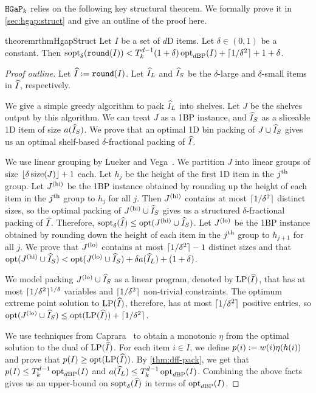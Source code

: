 $\operatorname{\mathtt{HGaP}}_{k}$ relies on the following key structural theorem.
We formally prove it in \cref{sec:hgap:struct} and give an outline of the proof here.
\begin{restatable}{theorem}{rthmHgapStruct}
\label{thm:hgap:struct}
Let $I$ be a set of $d$D items. Let $\delta \in (0, 1)$ be a constant. Then
$\operatorname{sopt}_{\delta}(\operatorname{\mathtt{round}}(I)) < T_k^{d-1}(1+\delta)\operatorname{opt}_{d\mathrm{BP}}(I) + \lceil 1/\delta^2 \rceil + 1 + \delta$.
\end{restatable}
\begin{proof}[Proof outline]
Let $\widehat{I} := \operatorname{\mathtt{round}}(I)$. Let $\widehat{I}_L$ and $\widehat{I}_S$ be the
$\delta$-large and $\delta$-small items in $\widehat{I}$, respectively.

We give a simple greedy algorithm to pack $\widehat{I}_L$ into shelves.
Let $J$ be the shelves output by this algorithm.
We can treat $J$ as a 1BP instance,
and $\widehat{I}_S$ as a sliceable 1D item of size $a(\widehat{I}_S)$.
We prove that an optimal 1D bin packing of $J \cup \widehat{I}_S$ gives us
an optimal shelf-based $\delta$-fractional packing of $\widehat{I}$.

We use linear grouping by Lueker and Vega~\cite{bp-aptas}.
We partition $J$ into linear groups of size $\left\lfloor \delta\operatorname{size}(J) \right\rfloor + 1$ each.
Let $h_j$ be the height of the first 1D item in the $j^{\textrm{th}}$ group.
Let $J^{\mathrm{(hi)}}$ be the 1BP instance obtained by rounding up the height of each item
in the $j^{\textrm{th}}$ group to $h_j$ for all $j$.
Then $J^{\mathrm{(hi)}}$ contains at most $\lceil 1/\delta^2 \rceil$ distinct sizes,
so the optimal packing of $J^{\mathrm{(hi)}} \cup \widehat{I}_S$ gives us a
structured $\delta$-fractional packing of $\widehat{I}$.
Therefore, $\operatorname{sopt}_{\delta}(\widehat{I}) \le \operatorname{opt}(J^{\mathrm{(hi)}} \cup \widehat{I}_S)$.
Let $J^{\mathrm{(lo)}}$ be the 1BP instance obtained by rounding down the height of each item
in the $j^{\textrm{th}}$ group to $h_{j+1}$ for all $j$.
We prove that $J^{\mathrm{(lo)}}$ contains at most $\lceil 1/\delta^2 \rceil-1$ distinct sizes and that
$\operatorname{opt}(J^{\mathrm{(hi)}} \cup \widehat{I}_S) < \operatorname{opt}(J^{\mathrm{(lo)}} \cup \widehat{I}_S) + \delta a(\widehat{I}_L) + (1 + \delta)$.

We model packing $J^{\mathrm{(lo)}} \cup \widehat{I}_S$ as a linear program, denoted by $\operatorname{LP}(\widehat{I})$,
that has at most $\lceil 1/\delta^2 \rceil^{1/\delta}$ variables and $\lceil 1/\delta^2 \rceil$ non-trivial constraints.
The optimum extreme point solution to $\operatorname{LP}(\widehat{I})$, therefore,
has at most $\lceil 1/\delta^2 \rceil$ positive entries,
so $\operatorname{opt}(J^{\mathrm{(lo)}} \cup \widehat{I}_S) \le \operatorname{opt}(\operatorname{LP}(\widehat{I})) + \lceil 1/\delta^2 \rceil$.

We use techniques from Caprara~\cite{caprara2008} to obtain a
monotonic \dff{} $\eta$ from the optimal solution to the dual of $\operatorname{LP}(\widehat{I})$.
For each item $i \in I$, we define $p(i) := w(i)\eta(h(i))$
and prove that $p(I) \ge \operatorname{opt}(\operatorname{LP}(\widehat{I}))$.
By \cref{thm:dff-pack}, we get that $p(I) \le T_k^{d-1}\operatorname{opt}_{d\mathrm{BP}}(I)$
and $a(\widehat{I}_L) \le T_k^{d-1}\operatorname{opt}_{d\mathrm{BP}}(I)$.
Combining the above facts gives us an upper-bound on $\operatorname{sopt}_{\delta}(\widehat{I})$
in terms of $\operatorname{opt}_{d\mathrm{BP}}(I)$.
\end{proof}

